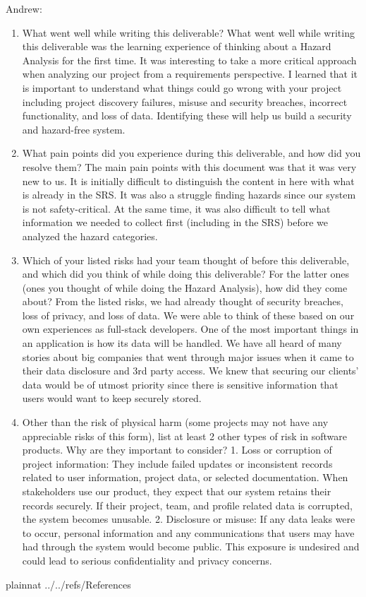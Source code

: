 \documentclass{article}
\begin{document}
Andrew:
\begin{enumerate}
    \item What went well while writing this deliverable?
    What went well while writing this deliverable was the learning experience of thinking about a Hazard Analysis
    for the first time. It was interesting to take a more critical approach when analyzing our project
    from a requirements perspective. I learned that it is important to understand what things could go 
    wrong with your project including project discovery failures, misuse and security breaches, incorrect
    functionality, and loss of data. Identifying these will help us build a security and hazard-free system.

    \item What pain points did you experience during this deliverable, and how
    did you resolve them?
    The main pain points with this document was that it was very new to us. It is initially difficult to 
    distinguish the content in here with what is already in the SRS. It was also a struggle finding 
    hazards since our system is not safety-critical. At the same time, it was also difficult to tell
    what information we needed to collect first (including in the SRS) before we analyzed the
    hazard categories.

    \item Which of your listed risks had your team thought of before this
    deliverable, and which did you think of while doing this deliverable? For
    the latter ones (ones you thought of while doing the Hazard Analysis), how
    did they come about?
    From the listed risks, we had already thought of security breaches, loss of privacy, and loss of data. We were able to think
    of these based on our own experiences as full-stack developers. One of the most important things in an 
    application is how its data will be handled. We have all heard of many stories about big companies that
    went through major issues when it came to their data disclosure and 3rd party access. We knew that securing our
    clients' data would be of utmost priority since there is sensitive information that users would want to keep securely stored.     

    \item Other than the risk of physical harm (some projects may not have any
    appreciable risks of this form), list at least 2 other types of risk in
    software products. Why are they important to consider?
    1. Loss or corruption of project information: They include failed updates or inconsistent records related to user information,
    project data, or selected documentation. When stakeholders use our product, they expect that our system retains their
    records securely. If their project, team, and profile related data is corrupted, the system becomes unusable.
    2. Disclosure or misuse: If any data leaks were to occur, personal information and any communications that users may have
    had through the system would become public. This exposure is undesired and could lead to serious confidentiality and privacy concerns.


\end{enumerate}

 {plainnat}
 {../../refs/References}
\end{document}
